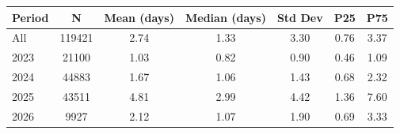 {
\def\sym#1{\ifmmode^{#1}\else\(^{#1}\)\fi}
\begin{tabular}{l*{1}{cccccc}}
\toprule
Period & N & Mean (days) & Median (days) & Std Dev & P25 & P75 \\
\midrule
All & 119421 &   2.74 &   1.33 &   3.30 &   0.76 &   3.37 \\
\midrule
2023 & 21100 &   1.03 &   0.82 &   0.90 &   0.46 &   1.09 \\
2024 & 44883 &   1.67 &   1.06 &   1.43 &   0.68 &   2.32 \\
2025 & 43511 &   4.81 &   2.99 &   4.42 &   1.36 &   7.60 \\
2026 & 9927 &   2.12 &   1.07 &   1.90 &   0.69 &   3.33 \\
\bottomrule
\end{tabular}
}
